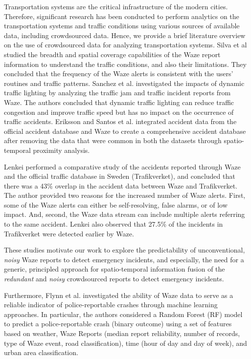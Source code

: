 \documentclass[conference]{IEEEtran}
\begin{document}
Transportation systems are the critical infrastructure of the modern cities. Therefore, significant research has been conducted to perform analytics on the transportation systems and traffic conditions using various sources of available data, including crowdsourced data. Hence, we provide a brief literature overview on the use of crowdsourced data for analyzing transportation systems.  
Silva et al \cite{silva2013traffic} studied the breadth and spatial coverage capabilities of the Waze report information to understand the traffic conditions, and also their limitations. They concluded that the frequency of the Waze alerts is consistent with the users' routines and traffic patterns. 
Sanchez et al. \cite{sanchez2019dynamic} investigated the impacts of dynamic traffic lighting by analyzing the traffic jam and traffic incident reports from Waze. The authors concluded that  dynamic traffic lighting can reduce traffic congestion and improve traffic speed but has no impact on the occurrence of traffic accidents. 
Eriksson \cite{eriksson2019towards} and Santos et al. \cite{dos2017analyzing} integrated accident data from the official accident database and Waze to create a comprehensive accident database after removing the data that were common in both the datasets through spatio-temporal proximity analysis. 

Lenkei \cite{lenkei2018crowdsourced} performed a comparative study of the accidents reported through Waze and the official traffic database in Sweden (Trafikverket), and concluded that there was a 43\% overlap in the accident data between Waze and Trafikverket. 
The author provided two reasons for the increased number of Waze alerts. First, some of the Waze alerts can either be self-resolving, false alarms, or of low impact. And, second, the Waze data stream can include multiple alerts referring to the same accident. Lenkei also observed that 27.5\% of the incidents in Trafikverket were detected earlier by Waze. 

These studies motivate our work to explore the predictability of unconventional, \textit{noisy} Waze reports to detect emergency incidents, and especially, the need for a generic, principled approach for spatio-temporal information fusion of the \textit{redundant} and \textit{noisy} crowdsourced reports to detect emergency incidents.  

Furthermore, Flynn et al. \cite{flynn2018estimating} investigated the ability of Waze data to serve as a reliable indicator of police-reportable crashes through machine learning approaches. In particular, the authors considered a Random Forest (RF) model to predict a police-reportable crash (binary outcome) using a set of  features based on weather, Waze Reports (median report reliability, number of records, type of Waze event, road classification), time (hour of day and day of week), and urban area classification. 
\end{document}
